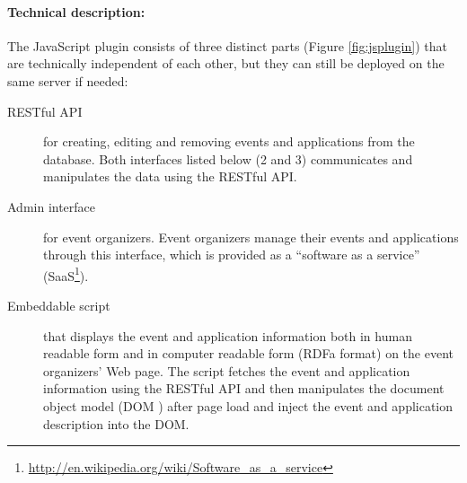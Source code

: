 \paragraph{Technical description:}
The JavaScript plugin consists of three distinct parts (Figure \ref{fig:jsplugin}) that are technically independent of each other, but they can still be deployed on the same server if needed:

\begin{description}
\item [RESTful  API] for creating, editing and removing events and applications from the database.
Both interfaces listed below (2 and 3) communicates and manipulates the data using the RESTful API.
\item [Admin interface] for event organizers.
Event organizers manage their events and applications through this interface, which is provided as a ``software as a service'' (SaaS\footnote{\url{http://en.wikipedia.org/wiki/Software_as_a_service}}).
\item [Embeddable script] that displays the event and application information both in human readable form and in computer readable form (RDFa format) on the event organizers' Web page.
The script fetches the event and application information using the RESTful API and then manipulates the document object model (DOM ) after page load and inject the event and application description into the DOM.
\end{description}



